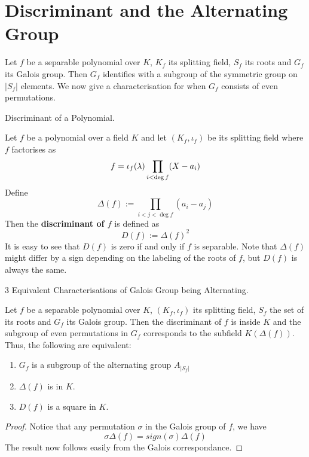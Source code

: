 \documentclass[../book.tex]{subfiles}
\begin{document}
\section{Discriminant and the Alternating Group}

\begin{rmk}
    Let $f$ be a separable polynomial over $K$, $K_f$ its splitting field,
    $S_f$ its roots and $G_f$ its Galois group. 
    Then $G_f$ identifies with a subgroup of the symmetric group on $|S_f|$ elements.
    We now give a characterisation for when $G_f$ consists of even permutations. 
\end{rmk}

\begin{dfn} Discriminant of a Polynomial. 
    
    Let $f$ be a polynomial over a field $K$
    and let $(K_f,\iota_f)$ be its splitting field
    where $f$ factorises as \[
        f = \iota_f(\lambda) \prod_{i < \deg f} (X - a_i)
    \]
    Define \[
        \Delta(f) := \prod_{i < j < \deg f} (a_i - a_j)
    \]
    Then the \textbf{discriminant of $f$} is defined as \[
        D(f) := \Delta(f)^2
    \]
    It is easy to see that $D(f)$ is zero if and only if $f$ is separable. 
    Note that $\Delta(f)$ might differ by a sign depending on
    the labeling of the roots of $f$, but $D(f)$ is always the same. 
    
\end{dfn}

\begin{thm} 3 Equivalent Characterisations of Galois Group being Alternating.
    
    Let $f$ be a separable polynomial over $K$, $(K_f,\iota_f)$ its splitting field,
    $S_f$ the set of its roots and $G_f$ its Galois group. 
    Then the discriminant of $f$ is inside $K$ and 
    the subgroup of even permutations in $G_f$ corresponds 
    to the subfield $K(\Delta(f))$.
    Thus, the following are equivalent: 
    \begin{enumerate}
        \item $G_f$ is a subgroup of the alternating group $A_{|S_f|}$
        \item $\Delta(f)$ is in $K$.
        \item $D(f)$ is a square in $K$. 
    \end{enumerate}
    
\end{thm}
\begin{proof}
    
    Notice that any permutation $\sigma$ in the Galois group of $f$, 
    we have \[
        \sigma \Delta(f) = sign(\sigma) \Delta(f)
    \]
    The result now follows easily from the Galois correspondance. 
    
\end{proof}
\end{document}

